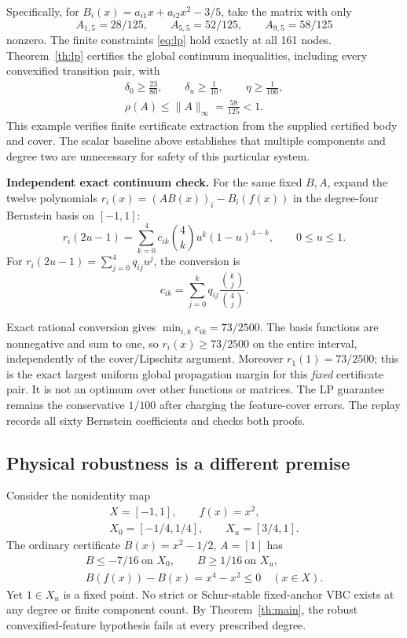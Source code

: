\documentclass[journal,10pt]{IEEEtran}
\theoremstyle{definition}\newtheorem{definition}{Definition}
\theoremstyle{remark}
\begin{document}
Specifically, for $B_i(x)=a_{i1}x+a_{i2}x^2-3/5$, take the matrix with only
\[
 A_{1,5}=28/125,\qquad A_{5,5}=52/125,\qquad A_{9,5}=58/125
\]
nonzero. The finite constraints \eqref{eq:lp} hold exactly at all 161 nodes. Theorem~\ref{th:lp} certifies the global continuum inequalities, including every convexified transition pair, with
\[
\begin{gathered}
 \delta_0\geq\tfrac{23}{80},\qquad \delta_u\geq\tfrac1{10},\qquad
 \eta\geq\tfrac1{100},\\
 \rho(A)\leq\|A\|_\infty=\tfrac{58}{125}<1.
\end{gathered}
\]
This example verifies finite certificate extraction from the supplied certified body and cover. The scalar baseline above establishes that multiple components and degree two are unnecessary for safety of this particular system.

\textbf{Independent exact continuum check.}
For the same fixed $B,A$, expand the twelve polynomials
$r_i(x)=(AB(x))_i-B_i(f(x))$ in the degree-four Bernstein basis on $[-1,1]$:
\[
 r_i(2u-1)=\sum_{k=0}^4 c_{ik}\binom4k u^k(1-u)^{4-k},
 \qquad 0\leq u\leq1.
\]
For $r_i(2u-1)=\sum_{j=0}^4 q_{ij}u^j$, the conversion is
\[
 c_{ik}=\sum_{j=0}^k q_{ij}\frac{\binom{k}{j}}{\binom{4}{j}}.
\]

Exact rational conversion gives $\min_{i,k}c_{ik}=73/2500$. The basis functions are nonnegative and sum to one, so $r_i(x)\geq73/2500$ on the entire interval, independently of the cover/Lipschitz argument. Moreover $r_1(1)=73/2500$; this is the exact largest uniform global propagation margin for this \emph{fixed} certificate pair. It is not an optimum over other functions or matrices. The LP guarantee remains the conservative $1/100$ after charging the feature-cover errors. The replay records all sixty Bernstein coefficients and checks both proofs.

\subsection{Physical robustness is a different premise}\label{sec:physical}
Consider the nonidentity map
\[
\begin{gathered}
 X=[-1,1],\qquad f(x)=x^2,\\
 X_0=[-1/4,1/4],\qquad X_u=[3/4,1].
\end{gathered}
\]
The ordinary certificate $B(x)=x^2-1/2$, $A=[1]$ has
\[
\begin{gathered}
 B\leq-7/16\ \text{on }X_0,\qquad B\geq1/16\ \text{on }X_u,\\
 B(f(x))-B(x)=x^4-x^2\leq0\quad(x\in X).
\end{gathered}
\]
Yet $1\in X_u$ is a fixed point. No strict or Schur-stable fixed-anchor VBC exists at any degree or finite component count. By Theorem~\ref{th:main}, the robust convexified-feature hypothesis fails at every prescribed degree.
\end{document}
